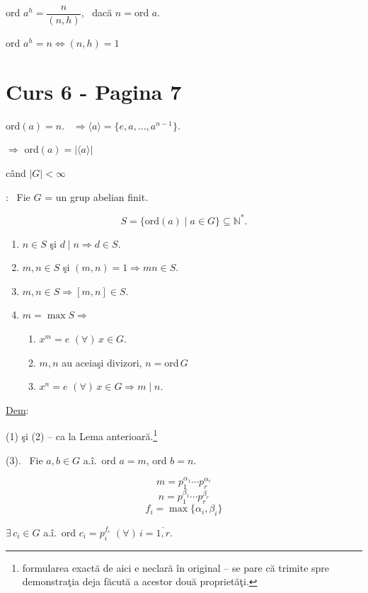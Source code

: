 \bigskip
\noindent ord $a^h = \dfrac{n}{(n,h)}$, \ dacă $n=$ord $a$.

\bigskip
\noindent ord $a^h = n \Leftrightarrow (n,h)=1$





\section*{Curs 6 - Pagina 7}

\noindent ord$(a)=n$. \ $\Rightarrow \langle a\rangle = \{e,a,\ldots,a^{n-1}\}$.

\noindent $\Rightarrow$ ord$(a) = |\langle a\rangle|$

\noindent când $|G|<\infty$

\bigskip
\noindent{}: \ Fie $G$ = un grup abelian finit.

\[
S=\{\text{ord}(a) \mid a\in G\} \subseteq \mathbb{N}^*.
\]

\begin{enumerate}
\item[(1)] $n\in S$ şi $d\mid n \Rightarrow d\in S$.
\item[(2)] $m,n\in S$ şi $(m,n)=1 \Rightarrow mn\in S$.
\item[(3)] $m,n\in S \Rightarrow [m,n]\in S$.
\item[(4)] $m=\max S \Rightarrow$
\begin{enumerate}
\item[(a)] $x^m=e$ $(\forall)\,x\in G$.
\item[(b)] $m,n$ au aceiaşi divizori, $n=$ord$\,G$
\item[(c)] $x^n=e$ $(\forall)\,x\in G \Rightarrow m\mid n$.
\end{enumerate}
\end{enumerate}

\bigskip
\noindent\underline{Dem}:

\noindent (1) şi (2) -- ca la Lema anterioară.\footnote{formularea exactă de aici e neclară în original -- se pare că trimite spre demonstraţia deja făcută a acestor două proprietăţi.}

\bigskip
\noindent (3). \ Fie $a,b\in G$ a.î.\ ord $a=m$, ord $b=n$.

\[
m=p_1^{\alpha_1}\cdots p_r^{\alpha_r}
\]
\[
n=p_1^{\beta_1}\cdots p_r^{\beta_r}
\]
\[
f_i=\max\{\alpha_i,\beta_i\}
\]

\noindent $\exists\, c_i\in G$ a.î.\ ord $c_i=p_i^{f_i}$ $(\forall)\,i=\overline{1,r}$.

